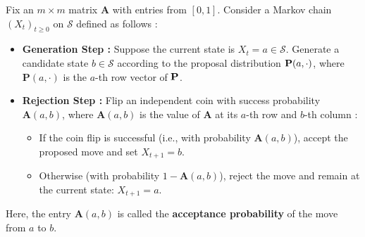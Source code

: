 \documentclass[12pt]{article}
\newcommand{\bP}{\bold P}
\newcommand{\calS}{\mathcal S}
\begin{document}
	Fix an $m \times m$ matrix $\bm A$ with entries from $[0, 1]$. Consider a Markov chain $(X_t)_{t \geq 0}$ on $\calS$ defined as follows :
	\begin{itemize}
	\item \textbf{Generation Step :} Suppose the current state is $X_t = a\in\calS$. Generate a candidate state $b \in \calS$ according to the proposal distribution $\bP(a, \cdot)$, where $\bm P(a, \cdot)$ is the $a$-th row vector of $\bP$.
	
	\item \textbf{Rejection Step :} Flip an independent coin with success probability $\bm A(a, b)$, where $\bm A(a, b)$ is the value of $\bm A$ at its $a$-th row and $b$-th column :
	\begin{itemize}
		\item If the coin flip is successful (i.e., with probability $\bm A(a, b)$), accept the proposed move and set $X_{t+1} = b$.
		\item Otherwise (with probability $1 - \bm A(a, b)$), reject the move and remain at the current state: $X_{t+1} = a$.
	\end{itemize}
\end{itemize}
	
	Here, the entry $\bm A(a, b)$ is called the \textbf{acceptance probability} of the move from $a$ to $b$.
	
\end{document}
